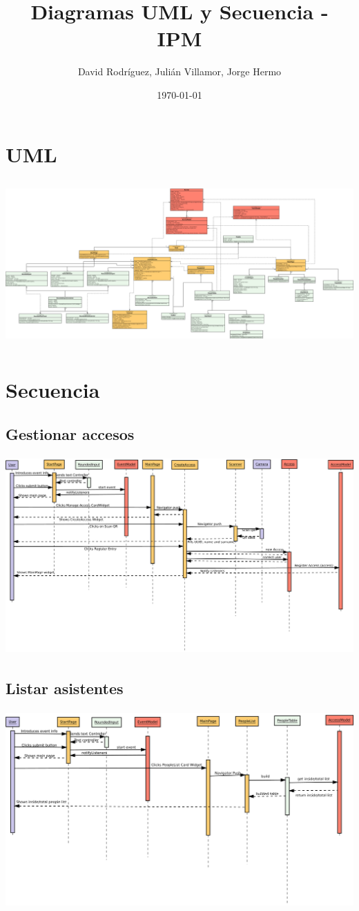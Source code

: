 \documentclass{article}
\title{Diagramas UML y Secuencia - IPM}
\author{David Rodríguez, Julián Villamor, Jorge Hermo}
\date{\today}
\begin{document}
\maketitle

\section{UML}

\begin{center}
	\includegraphics[height=240px]{uml.pdf}
\end{center}

\section{Secuencia}
\bigskip \bigskip

\subsection{Gestionar accesos}
\bigskip
\begin{center}
	\includegraphics[height=287px]{sec1.pdf}
\end{center}

\bigskip
\subsection{Listar asistentes}
\bigskip
\begin{center}
	\includegraphics[height=287px]{sec2.pdf}
\end{center}
\end{document}
